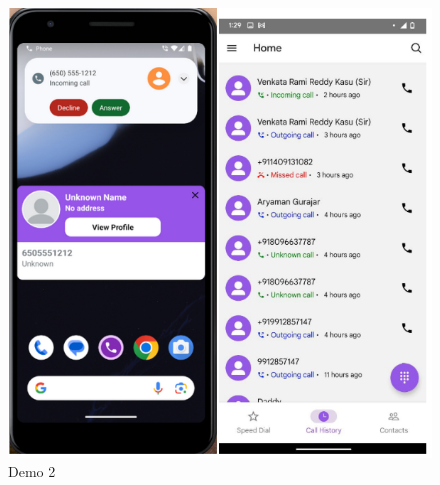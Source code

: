 \begin{figure}
    \centering
    \includegraphics[width=1\linewidth]{Media/demo2.png}
    \caption{Demo 2}
    \label{fig:App Start}
\end{figure}